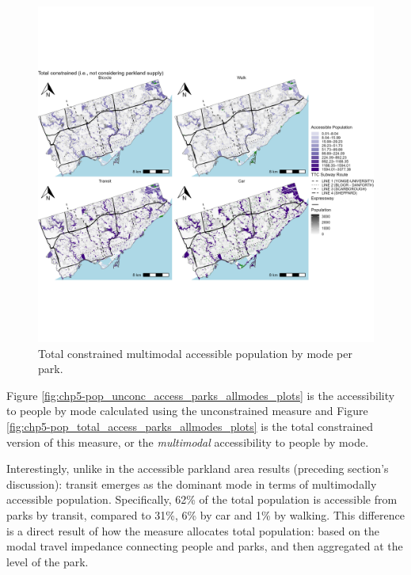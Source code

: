 \documentclass[
11pt, %
oneside, %
english, %
singlespacing, %
]{macthesis} %
\begin{document}
\begin{figure}

{\centering \includegraphics[width=6in]{./data/figures/chp5-pop_total_access_parks_allmodes_plots} 

}

\caption{\label{fig:chp5-pop_total_access_parks_allmodes_plots} Total constrained multimodal accessible population by mode per park.}\label{fig:unnamed-chunk-87}
\end{figure}

Figure \ref{fig:chp5-pop_unconc_access_parks_allmodes_plots} is the accessibility to people by mode calculated using the unconstrained measure and Figure \ref{fig:chp5-pop_total_access_parks_allmodes_plots} is the total constrained version of this measure, or the \emph{multimodal} accessibility to people by mode.

Interestingly, unlike in the accessible parkland area results (preceding section's discussion): transit emerges as the dominant mode in terms of multimodally accessible population. Specifically, 62\% of the total population is accessible from parks by transit, compared to 31\%, 6\% by car and 1\% by walking. This difference is a direct result of how the measure allocates total population: based on the modal travel impedance connecting people and parks, and then aggregated at the level of the park.
\end{document}
